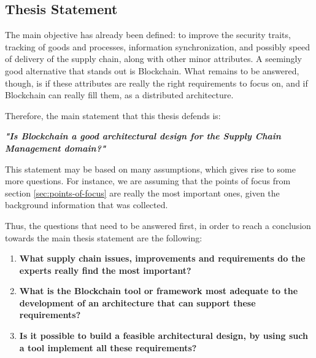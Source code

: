 \subsection{Thesis Statement}
\label{subsec:thesis-statement}
The main objective has already been defined: to improve the security traits, tracking of goods and processes, information synchronization, and possibly speed of delivery of the supply chain, along with other minor attributes. A seemingly good alternative that stands out is Blockchain. What remains to be answered, though, is if these attributes are really the right requirements to focus on, and if Blockchain can really fill them, as a distributed architecture.


Therefore, the main statement that this thesis defends is: 

\par \textbf{\textit{"Is Blockchain a good architectural design for the Supply Chain Management domain?"}}


This statement may be based on many assumptions, which gives rise to some more questions. For instance, we are assuming that the points of focus from section \ref{sec:points-of-focus} are really the most important ones, given the background information that was collected.

Thus, the questions that need to be answered first, in order to reach a conclusion towards the main thesis statement are the following:
\begin{enumerate}
\item \textbf{What supply chain issues, improvements and requirements do the experts really find the most important?}
\item \textbf{What is the Blockchain tool or framework most adequate to the development of an architecture that can support these requirements?}
\item \textbf{Is it possible to build a feasible architectural design, by using such a tool implement all these requirements?}
\end{enumerate}

